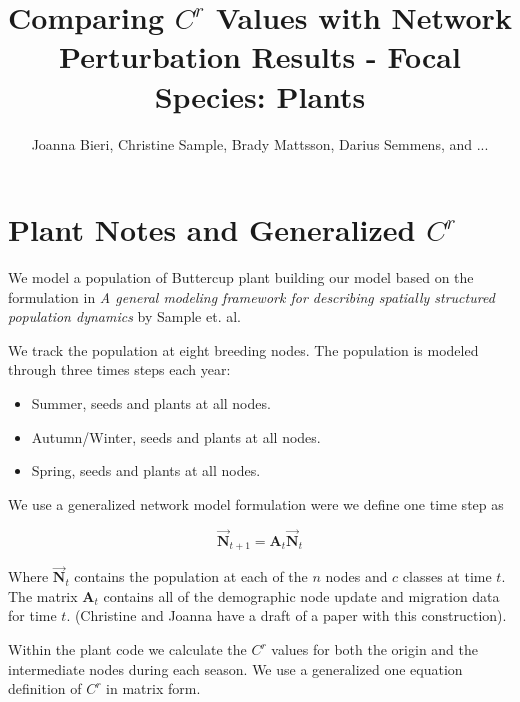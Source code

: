 \documentclass[10pt]{article}
\title{Comparing $C^r$ Values with Network Perturbation Results - Focal Species: Plants}
\date{}
\author{Joanna Bieri, Christine Sample, Brady Mattsson, Darius Semmens, and ...}
\begin{document}


\newcommand{\multilineR}[1]{\begin{tabular}[b]{@{}r@{}}#1\end{tabular}}
\newcommand{\multilineL}[1]{\begin{tabular}[b]{@{}l@{}}#1\end{tabular}}
\newcommand{\multilineC}[1]{\begin{tabular}[b]{@{}c@{}}#1\end{tabular}}

\thispagestyle{empty}

\maketitle

\tableofcontents


\section{Plant Notes and Generalized \texorpdfstring{$C^r$}{CR} }
We model a population of Buttercup plant building our model based on the formulation in  {\it{A general modeling framework for describing spatially structured population dynamics}} by Sample et. al.

We track the population at eight breeding nodes. The population is modeled through three times steps each year:
\begin{itemize}
\item Summer, seeds and plants at all nodes.
\item Autumn/Winter, seeds and plants at all nodes.
\item Spring, seeds and plants at all nodes. 
\end{itemize}

We use a generalized network model formulation were we define one time step as

\begin{equation}
\vec{\mathbf{N}}_{t+1}={\mathbf{A}_t}\vec{\mathbf{N}}_t
\end{equation}

Where $\vec{\mathbf{N}}_{t}$ contains the population at each of the $n$ nodes and $c$ classes at time $t$. The matrix $\mathbf{A}_t$ contains all of the demographic node update and migration data for time $t$. (Christine and Joanna have a draft of a paper with this construction).


Within the plant code we calculate the $C^r$ values for both the origin and the intermediate nodes during each season. We use a generalized one equation definition of $C^r$ in matrix form. %
\end{document}
